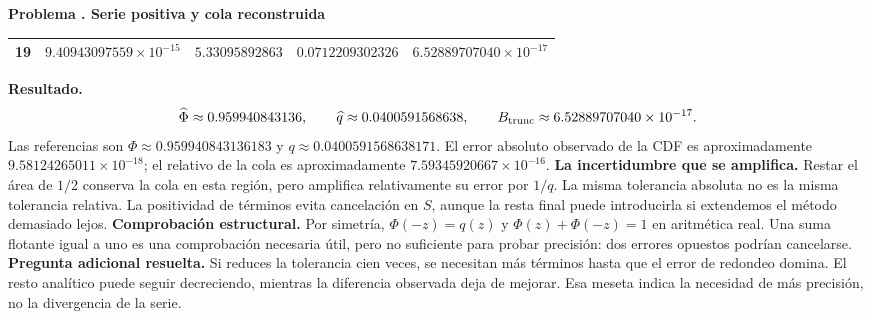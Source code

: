 \documentclass[11pt,a4paper]{article}
\theoremstyle{definition}
\newcounter{problema}
\newenvironment{resuelto}[1]{\refstepcounter{problema}\par\medskip\Needspace{6\baselineskip}\textbf{Problema \theproblema. #1}\par}{\par\medskip}
\begin{document}
\begin{resuelto}{Serie positiva y cola reconstruida}
\begin{center}
\begin{tabular}{rrrrr}
19&$9.40943097559\times10^{-15}$&$5.33095892863$&$0.0712209302326$&$6.52889707040\times10^{-17}$\\
\bottomrule\end{tabular}\end{center}
\textbf{Resultado.}
\[
\widehat\Phi\approx0.959940843136,\qquad \widehat q\approx0.0400591568638,\qquad B_{\rm trunc}\approx6.52889707040\times10^{-17}.
\]
Las referencias son $\Phi\approx0.959940843136183$ y $q\approx0.0400591568638171$. El error absoluto observado de la CDF es aproximadamente $9.58124265011\times10^{-18}$; el relativo de la cola es aproximadamente $7.59345920667\times10^{-16}$.
\textbf{La incertidumbre que se amplifica.} Restar el área de $1/2$ conserva la cola en esta región, pero amplifica relativamente su error por $1/q$. La misma tolerancia absoluta no es la misma tolerancia relativa. La positividad de términos evita cancelación en $S$, aunque la resta final puede introducirla si extendemos el método demasiado lejos.
\textbf{Comprobación estructural.} Por simetría, $\Phi(-z)=q(z)$ y $\Phi(z)+\Phi(-z)=1$ en aritmética real. Una suma flotante igual a uno es una comprobación necesaria útil, pero no suficiente para probar precisión: dos errores opuestos podrían cancelarse.
\textbf{Pregunta adicional resuelta.} Si reduces la tolerancia cien veces, se necesitan más términos hasta que el error de redondeo domina. El resto analítico puede seguir decreciendo, mientras la diferencia observada deja de mejorar. Esa meseta indica la necesidad de más precisión, no la divergencia de la serie.
\end{resuelto}
\end{document}
